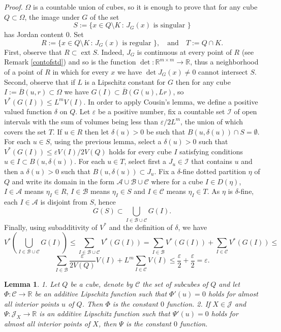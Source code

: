 \documentclass{article}
\newcommand{\proof}[1]{\textit{Proof. }#1}
\newtheorem{lemma}{Lemma}
\newcommand{\ext}{\mathop{\mathrm{ext}}\nolimits}
\newcommand{\R}{\ensuremath{\mathbb R}}
\newcommand{\J}{\mathscr{J}}
\newcommand{\ee}{\varepsilon}
\newcommand{\ol}{\overline}
\begin{document}
\proof{ $\Omega$ is a countable union of cubes, so it is enough to
prove that for any cube $Q\subset\Omega $, the image under $ G $
of the set
\[S:=\{x\in Q\setminus K\,:\,J_G(x)\mbox{ is singular }\}  \]
has Jordan content $ 0 $. Set
\[R:=\{x\in Q\setminus K\,:\,J_G(x)\mbox{ is regular }\},\quad
\mbox{and}\quad T:=Q\cap K.\] First, observe that $ R\subset\ext
S$. Indeed, $J_G$ is continuous at every point of $R$ (see Remark
\ref{contofstd}) and so is the function $\det:\R^{m\times
m}\to\R$, thus a neighborhood of a point of $ R $ in which for
every $ x $ we have $\det J_G(x)\neq0 $ cannot intersect $ S $.
Second, observe that if $ L $ is a Lipschitz constant for $ G $
then for any cube $I:=\ol{B}(u,r)\subset\Omega$ we have $
G(I)\subset\ol{B}(G(u),Lr)$, so $ V^*(G(I))\le L^mV(I) $. In order
to apply Cousin's lemma, we define a positive valued function $
\delta $ on $ Q $. Let $ \varepsilon $ be a positive number, fix a
countable set $ \mathcal{I} $ of open intervals with the sum of
volumes being less than $\ee/2L^m$, the union of which covers the
set $ T $. If $ u\in R $ then let $\delta(u)>0$ be such that
$B(u,\delta(u))\cap S=\emptyset$. For each $ u\in S$, using the
previous lemma, select a $ \delta(u)>0 $ such that $
V^*(G(I))\le\ee V(I)/2V(Q) $ holds for every cube $ I $ satisfying
conditions $ u\in I\subset B(u,\delta(u)) $. For each $ u\in T $,
select first a $ J_u\in\mathcal{I} $ that contains $ u $ and then
a $ \delta(u)>0 $ such that $B(u,\delta(u))\subset J_u $. Fix a $
\delta $-fine dotted partition $ \eta $ of $ Q $ and write its
domain in the form $ \mathcal{A}\cup\mathcal{B}\cup\mathcal{C} $
where for a cube $ I\in D(\eta) $, $ I\in\mathcal{A} $ means $
\eta_I\in R $, $ I\in\mathcal{B}$ means $\eta_I\in S$ and
$I\in\mathcal{C}$ means $\eta_I\in T$. As $\eta$ is $ \delta
$-fine, each $ I\in\mathcal{A} $ is disjoint from $ S $, hence
\[G(S)\subset\bigcup_{I\in\mathcal{B}\cup\mathcal{C}}G(I).\]
Finally, using subadditivity of $ V^* $ and the definition of
$\delta$, we have
\[V^*\left(\bigcup_{I\in\mathcal{B}\cup\mathcal{C}}G(I)\right)\le
\sum_{I\in\mathcal{B}\cup\mathcal{C}}V^*(G(I))=
\sum_{I\in\mathcal{B}}V^*(G(I))+\sum_{I\in\mathcal{C}}V^*(G(I))\le\]
\[\sum_{I\in\mathcal{B}}\frac{\ee}{2V(Q)}V(I)+L^m\sum_{I\in\mathcal{C}}V(I)
\le\frac{\ee}{2}+\frac{\ee}{2}=\ee.\]%
}%

\begin{lemma}
\label{fundamthm} 1. Let $ Q $ be a cube, denote by $ \mathcal{C}
$ the set of subcubes of $ Q $ and let $ \Phi:\mathcal{C}\to\R$ be
an additive Lipschitz function such that $ \Phi'(u)=0 $ holds for
almost all interior points $u$ of $ Q $. Then  $ \Phi $ is the
constant $ 0 $ function. 2. If $X\in\J$ and $\Psi\colon\J_X\to\R$
is an additive Lipschitz function such that $\Psi'(u)=0$ holds for
almost all interior points of $X$, then $\Psi$ is the constant $0$
function.
\end{lemma}
\end{document}
